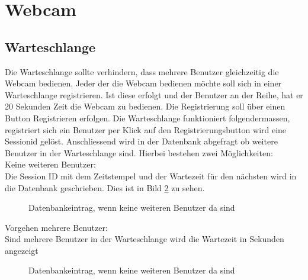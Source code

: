 \section{Webcam}

\subsection{Warteschlange}
Die Warteschlange sollte verhindern, dass mehrere Benutzer gleichzeitig die Webcam bedienen. Jeder der die Webcam bedienen möchte soll sich in einer Warteschlange registrieren. Ist diese erfolgt und der Benutzer an der Reihe, hat er 20 Sekunden Zeit die Webcam zu bedienen. Die Registrierung soll über einen Button Registrieren erfolgen. Die Warteschlange funktioniert folgendermassen, registriert sich ein Benutzer per Klick auf den Registrierungsbutton wird eine Sessionid gelöst. Anschliessend wird in der Datenbank abgefragt ob weitere Benutzer in der Warteschlange sind. Hierbei bestehen zwei Möglichkeiten:\\

Keine weiteren Benutzer:\\
Die Session ID mit dem Zeitstempel und der Wartezeit für den nächsten wird in die Datenbank geschrieben. Dies ist in Bild \ref{img:tblqueue} zu sehen.
\begin{figure}[h!]
	\centering
	\caption{Datenbankeintrag, wenn keine weiteren Benutzer da sind}
	\label{img:tblqueue}
\end{figure}

Vorgehen mehrere Benutzer:\\

Sind mehrere Benutzer in der Warteschlange wird die Wartezeit in Sekunden angezeigt
\begin{figure}[h!]
	\centering
	\caption{Datenbankeintrag, wenn keine weiteren Benutzer da sind}
	\label{img:tblqueue}
\end{figure}


